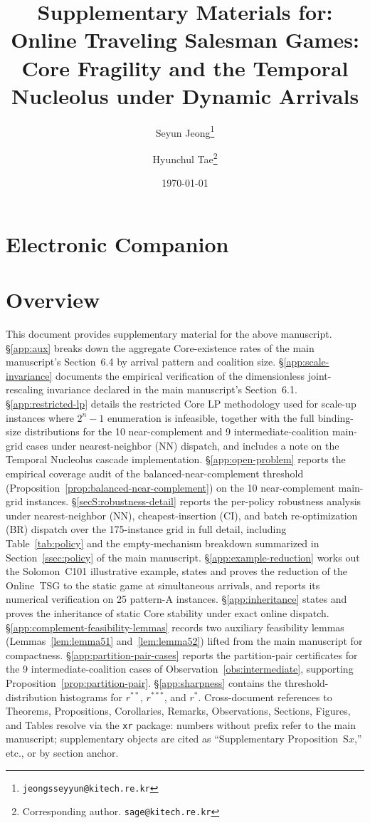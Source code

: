 \documentclass[11pt]{article}
\title{\textbf{Supplementary Materials for:\\
Online Traveling Salesman Games: Core Fragility and the Temporal Nucleolus under Dynamic Arrivals}}
\author[1]{Seyun Jeong\thanks{\texttt{jeongsseyyun@kitech.re.kr}}}
\author[1]{Hyunchul Tae\thanks{Corresponding author. \texttt{sage@kitech.re.kr}}}
\affil[1]{Korea Institute of Industrial Technology (KITECH), Cheonan, Republic of Korea}
\date{\today}
\theoremstyle{plain}
\theoremstyle{definition}
\theoremstyle{remark}
\begin{document}
\maketitle

\section*{Electronic Companion}

\section*{Overview}
This document provides supplementary material for the above manuscript. \S\ref{app:aux} breaks down the aggregate Core-existence rates of the main manuscript's Section~6.4 by arrival pattern and coalition size. \S\ref{app:scale-invariance} documents the empirical verification of the dimensionless joint-rescaling invariance declared in the main manuscript's Section~6.1. \S\ref{app:restricted-lp} details the restricted Core LP methodology used for scale-up instances where $2^n-1$ enumeration is infeasible, together with the full binding-size distributions for the 10 near-complement and 9 intermediate-coalition main-grid cases under nearest-neighbor (NN) dispatch, and includes a note on the Temporal Nucleolus cascade implementation. \S\ref{app:open-problem} reports the empirical coverage audit of the balanced-near-complement threshold (Proposition~\ref{prop:balanced-near-complement}) on the 10 near-complement main-grid instances. \S\ref{secS:robustness-detail} reports the per-policy robustness analysis under nearest-neighbor (NN), cheapest-insertion (CI), and batch re-optimization (BR) dispatch over the 175-instance grid in full detail, including Table~\ref{tab:policy} and the empty-mechanism breakdown summarized in Section~\ref{ssec:policy} of the main manuscript. \S\ref{app:example-reduction} works out the Solomon~C101 illustrative example, states and proves the reduction of the Online~TSG to the static game at simultaneous arrivals, and reports its numerical verification on 25 pattern-A instances. \S\ref{app:inheritance} states and proves the inheritance of static Core stability under exact online dispatch. \S\ref{app:complement-feasibility-lemmas} records two auxiliary feasibility lemmas (Lemmas~\ref{lem:lemma51} and~\ref{lem:lemma52}) lifted from the main manuscript for compactness. \S\ref{app:partition-pair-cases} reports the partition-pair certificates for the 9 intermediate-coalition cases of Observation~\ref{obs:intermediate}, supporting Proposition~\ref{prop:partition-pair}. \S\ref{app:sharpness} contains the threshold-distribution histograms for $r^{\ast\ast}$, $r^{\ast\ast\ast}$, and $r^{\ast}$. Cross-document references to Theorems, Propositions, Corollaries, Remarks, Observations, Sections, Figures, and Tables resolve via the \texttt{xr} package: numbers without prefix refer to the main manuscript; supplementary objects are cited as ``Supplementary Proposition~S$x$,'' etc., or by section anchor.
\end{document}
